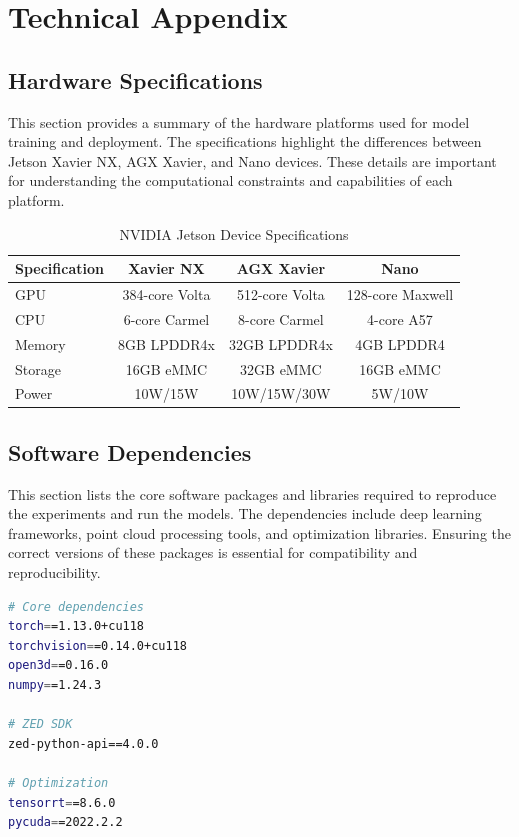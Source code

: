 \documentclass[12pt,a4paper]{report}
\begin{document}



\appendix

\chapter{Technical Appendix}

\section*{Hardware Specifications}
This section provides a summary of the hardware platforms used for model training and deployment. The specifications highlight the differences between Jetson Xavier NX, AGX Xavier, and Nano devices.
These details are important for understanding the computational constraints and capabilities of each platform.
\begin{table}[htbp]
\centering
\caption{NVIDIA Jetson Device Specifications}
\label{tab:jetson_specs}
\begin{tabular}{@{}lccc@{}}
\toprule
\textbf{Specification} & \textbf{Xavier NX} & \textbf{AGX Xavier} & \textbf{Nano} \\
\midrule
GPU & 384-core Volta & 512-core Volta & 128-core Maxwell \\
CPU & 6-core Carmel & 8-core Carmel & 4-core A57 \\
Memory & 8GB LPDDR4x & 32GB LPDDR4x & 4GB LPDDR4 \\
Storage & 16GB eMMC & 32GB eMMC & 16GB eMMC \\
Power & 10W/15W & 10W/15W/30W & 5W/10W \\
\bottomrule
\end{tabular}
\end{table}

\section*{Software Dependencies}
This section lists the core software packages and libraries required to reproduce the experiments and run the models. The dependencies include deep learning frameworks, point cloud processing tools, and optimization libraries.
Ensuring the correct versions of these packages is essential for compatibility and reproducibility.
\begin{lstlisting}[language=bash]
# Core dependencies
torch==1.13.0+cu118
torchvision==0.14.0+cu118
open3d==0.16.0
numpy==1.24.3

# ZED SDK
zed-python-api==4.0.0

# Optimization
tensorrt==8.6.0
pycuda==2022.2.2
\end{lstlisting}
\end{document}
